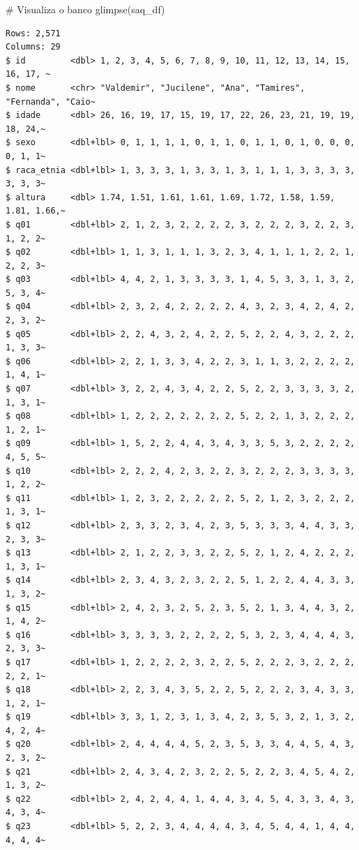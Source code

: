 \documentclass[
  letterpaper,
  DIV=11,
  numbers=noendperiod]{scrartcl}
\newenvironment{Shaded}{\begin{snugshade}}{\end{snugshade}}
\newcommand{\CommentTok}[1]{\textcolor[rgb]{0.37,0.37,0.37}{#1}}
\newcommand{\FunctionTok}[1]{\textcolor[rgb]{0.28,0.35,0.67}{#1}}
\newcommand{\NormalTok}[1]{\textcolor[rgb]{0.00,0.23,0.31}{#1}}
\begin{document}
\begin{Shaded}
\begin{Highlighting}[]
\CommentTok{\# Visualiza o banco}
\FunctionTok{glimpse}\NormalTok{(saq\_df)}
\end{Highlighting}
\end{Shaded}

\begin{verbatim}
Rows: 2,571
Columns: 29
$ id         <dbl> 1, 2, 3, 4, 5, 6, 7, 8, 9, 10, 11, 12, 13, 14, 15, 16, 17, ~
$ nome       <chr> "Valdemir", "Jucilene", "Ana", "Tamires", "Fernanda", "Caio~
$ idade      <dbl> 26, 16, 19, 17, 15, 19, 17, 22, 26, 23, 21, 19, 19, 18, 24,~
$ sexo       <dbl+lbl> 0, 1, 1, 1, 1, 0, 1, 1, 0, 1, 1, 0, 1, 0, 0, 0, 0, 1, 1~
$ raca_etnia <dbl+lbl> 1, 3, 3, 3, 1, 3, 3, 1, 3, 1, 1, 1, 3, 3, 3, 3, 3, 3, 3~
$ altura     <dbl> 1.74, 1.51, 1.61, 1.61, 1.69, 1.72, 1.58, 1.59, 1.81, 1.66,~
$ q01        <dbl+lbl> 2, 1, 2, 3, 2, 2, 2, 2, 3, 2, 2, 2, 3, 2, 2, 3, 1, 2, 2~
$ q02        <dbl+lbl> 1, 1, 3, 1, 1, 1, 3, 2, 3, 4, 1, 1, 1, 2, 2, 1, 2, 2, 3~
$ q03        <dbl+lbl> 4, 4, 2, 1, 3, 3, 3, 3, 1, 4, 5, 3, 3, 1, 3, 2, 5, 3, 4~
$ q04        <dbl+lbl> 2, 3, 2, 4, 2, 2, 2, 2, 4, 3, 2, 3, 4, 2, 4, 2, 2, 3, 2~
$ q05        <dbl+lbl> 2, 2, 4, 3, 2, 4, 2, 2, 5, 2, 2, 4, 3, 2, 2, 2, 1, 3, 3~
$ q06        <dbl+lbl> 2, 2, 1, 3, 3, 4, 2, 2, 3, 1, 1, 3, 2, 2, 2, 2, 1, 4, 1~
$ q07        <dbl+lbl> 3, 2, 2, 4, 3, 4, 2, 2, 5, 2, 2, 3, 3, 3, 3, 2, 1, 3, 1~
$ q08        <dbl+lbl> 1, 2, 2, 2, 2, 2, 2, 2, 5, 2, 2, 1, 3, 2, 2, 2, 1, 2, 1~
$ q09        <dbl+lbl> 1, 5, 2, 2, 4, 4, 3, 4, 3, 3, 5, 3, 2, 2, 2, 2, 4, 5, 5~
$ q10        <dbl+lbl> 2, 2, 2, 4, 2, 3, 2, 2, 3, 2, 2, 2, 3, 3, 3, 3, 1, 2, 2~
$ q11        <dbl+lbl> 1, 2, 3, 2, 2, 2, 2, 2, 5, 2, 1, 2, 3, 2, 2, 2, 1, 3, 1~
$ q12        <dbl+lbl> 2, 3, 3, 2, 3, 4, 2, 3, 5, 3, 3, 3, 4, 4, 3, 3, 2, 3, 3~
$ q13        <dbl+lbl> 2, 1, 2, 2, 3, 3, 2, 2, 5, 2, 1, 2, 4, 2, 2, 2, 1, 3, 1~
$ q14        <dbl+lbl> 2, 3, 4, 3, 2, 3, 2, 2, 5, 1, 2, 2, 4, 4, 3, 3, 1, 3, 2~
$ q15        <dbl+lbl> 2, 4, 2, 3, 2, 5, 2, 3, 5, 2, 1, 3, 4, 4, 3, 2, 1, 4, 2~
$ q16        <dbl+lbl> 3, 3, 3, 3, 2, 2, 2, 2, 5, 3, 2, 3, 4, 4, 4, 3, 2, 3, 3~
$ q17        <dbl+lbl> 1, 2, 2, 2, 2, 3, 2, 2, 5, 2, 2, 2, 3, 2, 2, 2, 2, 2, 1~
$ q18        <dbl+lbl> 2, 2, 3, 4, 3, 5, 2, 2, 5, 2, 2, 2, 3, 4, 3, 3, 1, 2, 1~
$ q19        <dbl+lbl> 3, 3, 1, 2, 3, 1, 3, 4, 2, 3, 5, 3, 2, 1, 3, 2, 4, 2, 4~
$ q20        <dbl+lbl> 2, 4, 4, 4, 4, 5, 2, 3, 5, 3, 3, 4, 4, 5, 4, 3, 2, 3, 2~
$ q21        <dbl+lbl> 2, 4, 3, 4, 2, 3, 2, 2, 5, 2, 2, 3, 4, 5, 4, 2, 1, 3, 2~
$ q22        <dbl+lbl> 2, 4, 2, 4, 4, 1, 4, 4, 3, 4, 5, 4, 3, 3, 4, 3, 4, 3, 4~
$ q23        <dbl+lbl> 5, 2, 2, 3, 4, 4, 4, 4, 3, 4, 5, 4, 4, 1, 4, 4, 4, 4, 4~
\end{verbatim}
\end{document}
